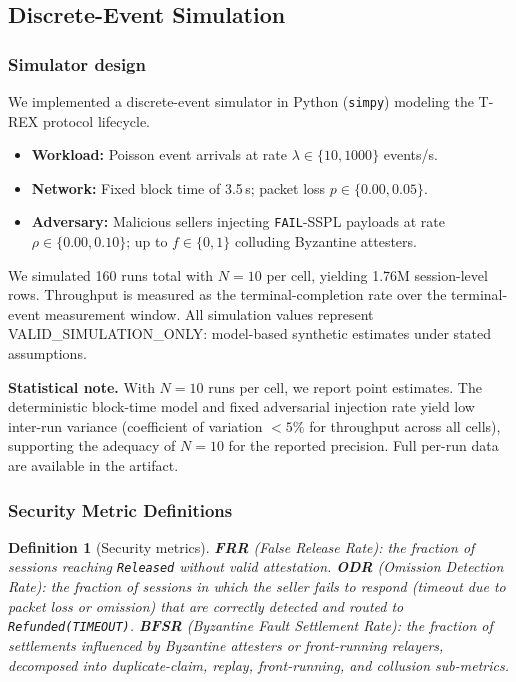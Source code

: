 \documentclass[journal]{IEEEtran}
\newtheorem{definition}[theorem]{Definition}
\begin{document}
\subsection{Discrete-Event Simulation}
\label{sec:sim}

\subsubsection{Simulator design}
We implemented a discrete-event simulator in Python (\texttt{simpy})
modeling the T-REX protocol lifecycle.

\begin{itemize}[leftmargin=*]
\item \textbf{Workload:} Poisson event arrivals at rate
$\lambda \in \{10, 1000\}$ events/s.
\item \textbf{Network:} Fixed block time of 3.5\,s; packet loss
$p \in \{0.00, 0.05\}$.
\item \textbf{Adversary:} Malicious sellers injecting
\texttt{FAIL}-SSPL payloads at rate $\rho \in \{0.00, 0.10\}$;
up to $f \in \{0, 1\}$ colluding Byzantine attesters.
\end{itemize}

We simulated 160 runs total with $N = 10$ per cell, yielding 1.76M
session-level rows.
Throughput is measured as the terminal-completion rate over the
terminal-event measurement window.
All simulation values represent VALID\_SIMULATION\_ONLY:
model-based synthetic estimates under stated assumptions.

\noindent\textbf{Statistical note.}
With $N = 10$ runs per cell, we report point estimates.
The deterministic block-time model and fixed adversarial injection
rate yield low inter-run variance (coefficient of variation
$< 5\%$ for throughput across all cells), supporting the adequacy
of $N = 10$ for the reported precision.
Full per-run data are available in the artifact.

\subsubsection{Security Metric Definitions}
\begin{definition}[Security metrics]
\label{def:secmetrics}
\textbf{FRR} (False Release Rate): the fraction of sessions
reaching \texttt{Released} without valid attestation.
\textbf{ODR} (Omission Detection Rate): the fraction of sessions
in which the seller fails to respond (timeout due to packet loss
or omission) that are correctly detected and routed to
\texttt{Refunded(TIMEOUT)}.
\textbf{BFSR} (Byzantine Fault Settlement Rate): the fraction of
settlements influenced by Byzantine attesters or front-running
relayers, decomposed into duplicate-claim, replay, front-running,
and collusion sub-metrics.
\end{definition}
\end{document}
